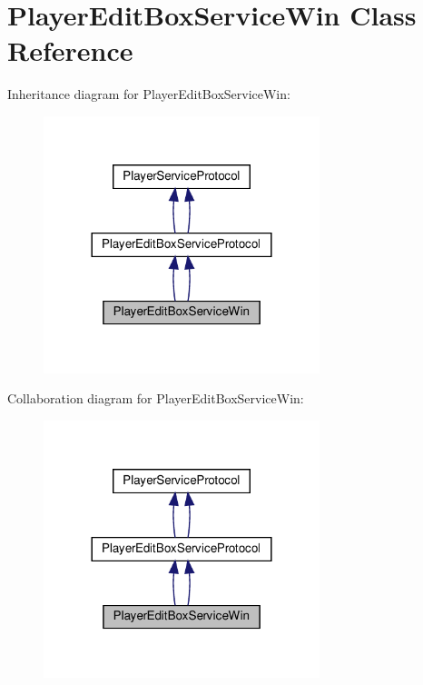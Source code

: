 \hypertarget{classPlayerEditBoxServiceWin}{}\section{Player\+Edit\+Box\+Service\+Win Class Reference}
\label{classPlayerEditBoxServiceWin}


Inheritance diagram for Player\+Edit\+Box\+Service\+Win\+:
\nopagebreak
\begin{figure}[H]
\begin{center}
\leavevmode
\includegraphics[width=228pt]{classPlayerEditBoxServiceWin__inherit__graph}
\end{center}
\end{figure}


Collaboration diagram for Player\+Edit\+Box\+Service\+Win\+:
\nopagebreak
\begin{figure}[H]
\begin{center}
\leavevmode
\includegraphics[width=228pt]{classPlayerEditBoxServiceWin__coll__graph}
\end{center}
\end{figure}
